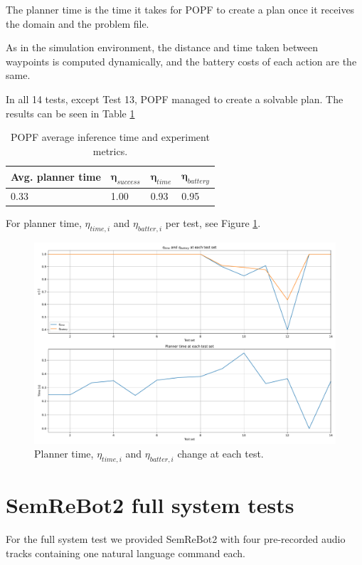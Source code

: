 The planner time is the time it takes for POPF to create a plan once it receives the domain and the problem file.

As in the simulation environment, the distance and time taken between waypoints is computed dynamically, and the battery costs of each action are the same.

In all 14 tests, except Test 13, POPF managed to create a solvable plan. The results can be seen in Table \ref{tab:popf_metrics}

\begin{table}[]
\centering
{%
\begin{tabular}{|l|l|l|l|}
\hline
\textbf{Avg. planner time} & $\mathbf{\eta}_{success}$ & $\mathbf{\eta}_{time}$ & $\mathbf{\eta}_{battery}$ \\ \hline
0.33                       & 1.00                      & 0.93                   & 0.95                      \\ \hline
\end{tabular}%
}
\caption[POPF experiment results]{POPF average inference time and experiment metrics.}
\label{tab:popf_metrics}
\end{table}

For planner time, $\eta_{time, i}$ and $\eta_{batter, i}$ per test, see Figure \ref{fig:popf_metrics}.

\begin{figure}
    \centering
    \includegraphics[width=\textwidth]{figures/popf_metrics.pdf}
    \caption[POPF metrics]{Planner time, $\eta_{time, i}$ and $\eta_{batter, i}$ change at each test.}
    \label{fig:popf_metrics}
\end{figure}

\section{SemReBot2 full system tests}\label{sec:SemReBot2_experiments}
For the full system test we provided SemReBot2 with four pre-recorded audio tracks containing one natural language command each. 